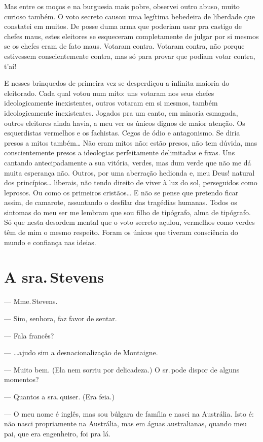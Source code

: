 Mas entre os moços e na burguesia mais pobre, observei outro abuso,
muito curioso também. O voto secreto causou uma legítima bebedeira de
liberdade que constatei em muitos. De posse duma arma que poderiam usar
pra castigo de chefes maus, estes eleitores se esqueceram completamente
de julgar por si mesmos se os chefes eram de fato maus. Votaram contra.
Votaram contra, não porque estivessem conscientemente contra, mas só
para provar que podiam votar contra, t'aí!

E nesses brinquedos de primeira vez se desperdiçou a infinita maioria do
eleitorado. Cada qual votou num mito: uns votaram nos seus chefes
ideologicamente inexistentes, outros votaram em si mesmos, também
ideologicamente inexistentes. Jogados pra um canto, em minoria esmagada,
outros eleitores ainda havia, a meu ver os únicos dignos de maior
atenção. Os esquerdistas vermelhos e os fachistas. Cegos de ódio e
antagonismo. Se diria presos a mitos também\ldots{} Não eram mitos não: estão
presos, não tem dúvida, mas conscientemente presos a ideologias
perfeitamente delimitadas e fixas. Uns cantando antecipadamente a sua
vitória, verdes, mas dum verde que não me dá muita esperança não.
Outros, por uma aberração hedionda e, meu Deus! natural dos
princípios\ldots{} liberais, não tendo direito de viver à luz do sol,
perseguidos como leprosos. Ou como os primeiros cristãos\ldots{} E não se
pense que pretendo ficar assim, de camarote, assuntando o desfilar das
tragédias humanas. Todos os sintomas do meu ser me lembram que sou filho
de tipógrafo, alma de tipógrafo. Só que nesta desordem mental que o voto
secreto açulou, vermelhos como verdes têm de mim o mesmo respeito. Foram
os únicos que tiveram consciência do mundo e confiança nas ideias.

\chapter{A sra.\,Stevens}

--- Mme.\,Stevens.

--- Sim, senhora, faz favor de sentar.

--- Fala francês?

--- \ldots{}ajudo sim a desnacionalização de Montaigne.

--- Muito bem. (Ela nem sorriu por delicadeza.) O sr.\,pode dispor de
alguns momentos?

--- Quantos a sra.\,quiser. (Era feia.)

--- O meu nome é inglês, mas sou búlgara de família e nasci na
Austrália. Isto é: não nasci propriamente na Austrália, mas em águas
australianas, quando meu pai, que era engenheiro, foi pra lá.

